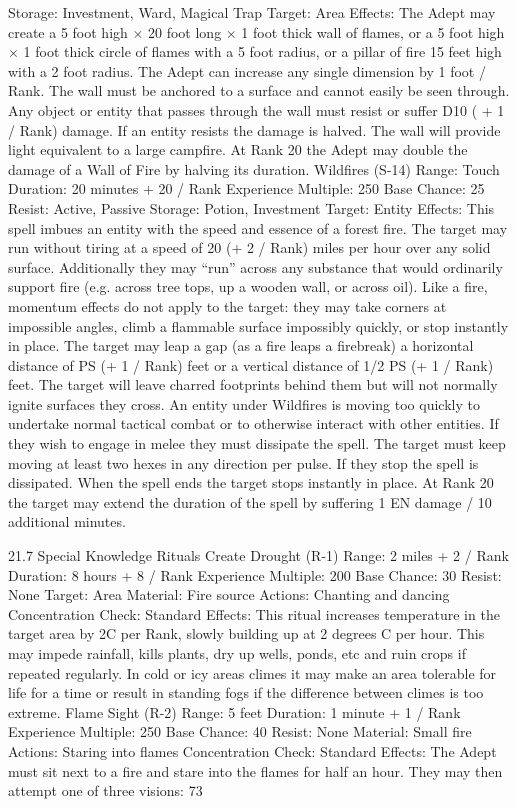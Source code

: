 \documentclass[a4paper]{article}
\begin{document}
\begin{multicols}{3}
Storage: Investment, Ward, Magical Trap
Target: Area
Effects: The Adept may create a 5 foot high × 20
foot long × 1 foot thick wall of flames, or a 5 foot
high × 1 foot thick circle of flames with a 5 foot
radius, or a pillar of fire 15 feet high with a 2 foot
radius. The Adept can increase any single dimension by 1 foot / Rank. The wall must be anchored
to a surface and cannot easily be seen through. Any
object or entity that passes through the wall must
resist or suffer D10 ( + 1 / Rank) damage. If an
entity resists the damage is halved. The wall will
provide light equivalent to a large campfire. At
Rank 20 the Adept may double the damage of a
Wall of Fire by halving its duration.
Wildfires (S-14)
Range: Touch
Duration: 20 minutes + 20 / Rank
Experience Multiple: 250
Base Chance: 25%
Resist: Active, Passive
Storage: Potion, Investment
Target: Entity
Effects: This spell imbues an entity with the speed
and essence of a forest fire. The target may run
without tiring at a speed of 20 (+ 2 / Rank) miles
per hour over any solid surface. Additionally they
may “run” across any substance that would ordinarily support fire (e.g. across tree tops, up a
wooden wall, or across oil). Like a fire, momentum
effects do not apply to the target: they may take
corners at impossible angles, climb a flammable
surface impossibly quickly, or stop instantly in
place. The target may leap a gap (as a fire leaps a
firebreak) a horizontal distance of PS (+ 1 / Rank)
feet or a vertical distance of 1/2 PS (+ 1 / Rank)
feet. The target will leave charred footprints behind
them but will not normally ignite surfaces they
cross.
An entity under Wildfires is moving too quickly to
undertake normal tactical combat or to otherwise
interact with other entities. If they wish to engage
in melee they must dissipate the spell.
The target must keep moving at least two hexes in
any direction per pulse. If they stop the spell is
dissipated. When the spell ends the target stops
instantly in place.
At Rank 20 the target may extend the duration of
the spell by suffering 1 EN damage / 10 additional
minutes.

21.7 Special Knowledge Rituals
Create Drought (R-1)
Range: 2 miles + 2 / Rank
Duration: 8 hours + 8 / Rank
Experience Multiple: 200
Base Chance: 30%
Resist: None
Target: Area
Material: Fire source
Actions: Chanting and dancing
Concentration Check: Standard
Effects: This ritual increases temperature in the
target area by 2C per Rank, slowly building up at 2
degrees C per hour. This may impede rainfall, kills
plants, dry up wells, ponds, etc and ruin crops if
repeated regularly. In cold or icy areas climes it
may make an area tolerable for life for a time or
result in standing fogs if the difference between
climes is too extreme.
Flame Sight (R-2)
Range: 5 feet
Duration: 1 minute + 1 / Rank
Experience Multiple: 250
Base Chance: 40%
Resist: None
Material: Small fire
Actions: Staring into flames
Concentration Check: Standard
Effects: The Adept must sit next to a fire and stare
into the flames for half an hour. They may then
attempt one of three visions:
73


\end{multicols}
\end{document}
